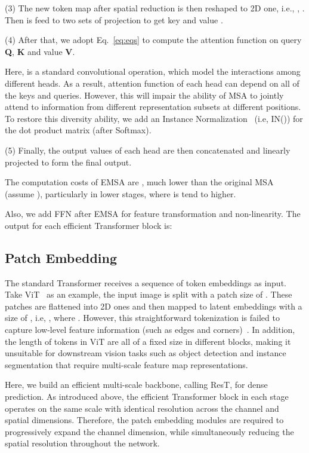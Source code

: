 \documentclass{article}
\begin{document}
(3) The new token map after spatial reduction  is then reshaped to 2D one, i.e., , . Then  is feed to two sets of projection to get key  and value .

(4) After that, we adopt Eq.~\ref{eq:eqs} to compute the attention function on query \textbf{Q}, \textbf{K} and value \textbf{V}.

Here,  is a standard  convolutional operation, which model the interactions among different heads. As a result, attention function of each head can depend on all of the keys and queries. However, this will impair the ability of MSA to jointly attend to information from different representation subsets at different positions. To restore this diversity ability, we add an Instance Normalization~\cite{DBLP:journals/corr/UlyanovVL16} (i.e, IN()) for the dot product matrix (after Softmax).

(5) Finally, the output values of each head are then concatenated and linearly projected to form the final output.

The computation costs of EMSA are , much lower than the original MSA (assume ), particularly in lower stages, where  is tend to higher.

Also, we add FFN after EMSA for feature transformation and non-linearity. The output for each efficient Transformer block is:


\subsection{Patch Embedding}
\label{sec:3.3}
The standard Transformer receives a sequence of token embeddings as input. Take ViT~\cite{DBLP:journals/corr/abs-2010-11929} as an example, the input image  is split with a patch size of . These patches are flattened into 2D ones and then mapped to latent embeddings with a size of , i.e, , where . However, this straightforward tokenization is failed to capture low-level feature information (such as edges and corners)~\cite{DBLP:journals/corr/abs-2101-11986}. In addition, the length of tokens in ViT are all of a fixed size in different blocks, making it unsuitable for downstream vision tasks such as object detection and instance segmentation that require multi-scale feature map representations.

Here, we build an efficient multi-scale backbone, calling ResT, for dense prediction. As introduced above, the efficient Transformer block in each stage operates on the same scale with identical resolution across the channel and spatial dimensions. Therefore, the patch embedding modules are required to progressively expand the channel dimension, while simultaneously reducing the spatial resolution throughout the network. 
\end{document}
